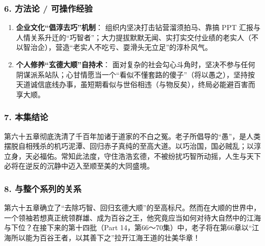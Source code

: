 \subsubsection{6. 方法论 / 可操作经验}
\begin{enumerate}
    \item \textbf{企业文化“倡淳去巧”机制}：
    组织内坚决打击钻营溜须拍马、靠搞 PPT 汇报与人情关系升迁的“巧智者”；大力提拔默默无闻、实打实交付业绩的老实人（不以智治企），营造“老实人不吃亏、耍滑头无立足”的淳朴风气。
    \item \textbf{个人修养“玄德大顺”自持术}：
    面对复杂的社会勾心斗角时，坚决不参与任何阴谋派系站队；心甘情愿当一个“看似不懂套路的傻子”（将以愚之），坚持按天道诚信底线办事，虽短期看似与世俗相违（与物反矣），终局必能避百害而享大顺。
\end{enumerate}

\subsubsection{7. 本集结论}
第六十五章彻底洗清了千百年加诸于道家的不白之冤。老子所倡导的“愚”，是人类摆脱自相残杀的机巧泥潭、回归赤子真纯的至高大道。以巧治国，国必贼乱；以淳立身，天必福佑。常知此法度，守住浩浩玄德，不被纷扰巧智所动摇，人生与天下必将在逆反的沉静中迈入至顺至美的大同盛境。

\subsubsection{8. 与整个系列的关系}
第六十五章确立了“去除巧智、回归玄德大顺”的至高标尺。然而在大顺的世界中，一个领袖若想真正统领群雄、成为百谷之王，他究竟应当如何对待大自然中的江海与下位？在接下来的第十四批（Part 14，第66～70集）中，老子将在第66章以“江海所以能为百谷王者，以其善下之”拉开江海王道的壮美华章！